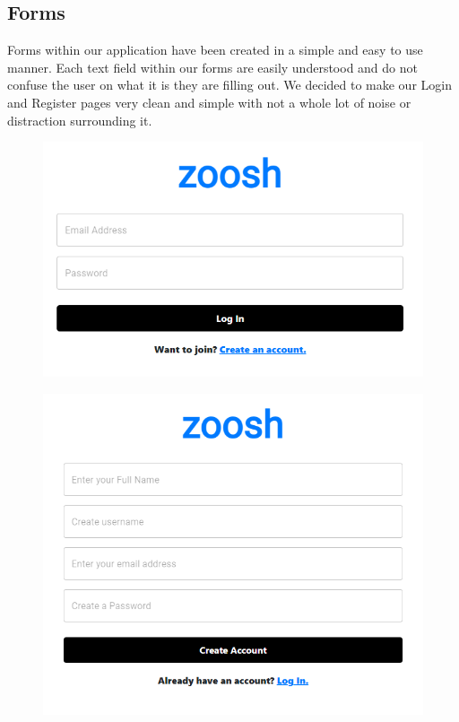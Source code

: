 \subsection{Forms}
Forms within our application have been created in a simple and easy to use manner. Each text field within our forms are easily understood and do not confuse the user on what it is they are filling out. We decided to make our Login and Register pages very clean and simple with not a whole lot of noise or distraction surrounding it. 

\begin{figure}[H]
  \centering
  \includegraphics[scale=0.45]{img/login2.png}
  \label{fig:Login Screen}
\end{figure}

\begin{figure}[H]
  \centering
  \includegraphics[scale=0.45]{img/join.PNG}
  \label{fig:Join Screen}
\end{figure}


